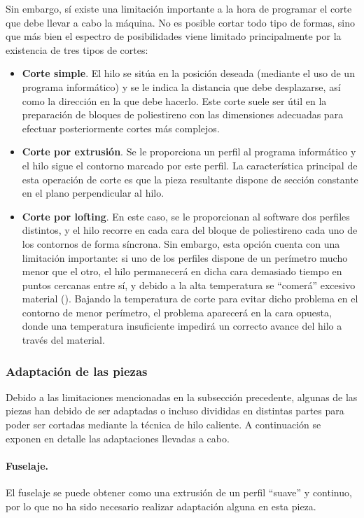 Sin embargo, sí existe una limitación importante a la hora de programar el corte que debe llevar a cabo la máquina. No es posible cortar todo tipo de formas, sino que más bien el espectro de posibilidades viene limitado principalmente por la existencia de tres tipos de cortes:
\begin{itemize}
\item \textbf{Corte simple}. El hilo se sitúa en la posición deseada (mediante el uso de un programa informático) y se le indica la distancia que debe desplazarse, así como la dirección en la que debe hacerlo. Este corte suele ser útil en la preparación de bloques de poliestireno con las dimensiones adecuadas para efectuar posteriormente cortes más complejos.
\item \textbf{Corte por extrusión}. Se le proporciona un perfil al programa informático y el hilo sigue el contorno marcado por este perfil. La característica principal de esta operación de corte es que la pieza resultante dispone de sección constante en el plano perpendicular al hilo.
\item \textbf{Corte por lofting}. En este caso, se le proporcionan al software dos perfiles distintos, y el hilo recorre en cada cara del bloque de poliestireno cada uno de los contornos de forma síncrona. Sin embargo, esta opción cuenta con una limitación importante: si uno de los perfiles dispone de un perímetro mucho menor que el otro, el hilo permanecerá en dicha cara demasiado tiempo en puntos cercanas entre sí, y debido a la alta temperatura se “comerá” excesivo material (). Bajando la temperatura de corte para evitar dicho problema en el contorno de menor perímetro, el problema aparecerá en la cara opuesta, donde una temperatura insuficiente impedirá un correcto avance del hilo a través del material.
\end{itemize}


\subsubsection{Adaptación de las piezas}
\label{sec:building:technique:adaptation}

Debido a las limitaciones mencionadas en la subsección precedente, algunas de las piezas han debido de ser adaptadas o incluso divididas en distintas partes para poder ser cortadas mediante la técnica de hilo caliente. A continuación se exponen en detalle las adaptaciones llevadas a cabo.

\paragraph{Fuselaje.} El fuselaje se puede obtener como una extrusión de un perfil “suave” y continuo, por lo que no ha sido necesario realizar adaptación alguna en esta pieza.

